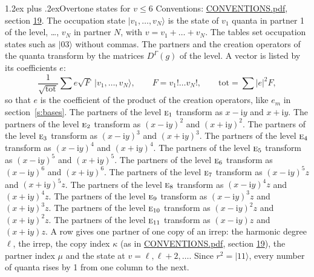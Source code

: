 \documentclass[10pt,a4paper]{article}
\makeatletter
\renewcommand\section{\@startsection{section}{1}{\z@}{-3ex plus -1ex minus -.2ex}%
  {1.2ex plus .2ex}{\normalfont\large\sffamily\bfseries\color{parttitle}}}
\numberwithin{equation}{section}
\newcommand{\irr}[1]{\text{\normalfont\scshape #1}}
\newcommand{\iunit}{\mathrm{i}}
\newcommand{\repD}[1]{D^{#1}}
\newcommand{\mult}{\kappa}
\newcommand{\intx}{\mu}
\newcommand{\occ}[1]{\lvert #1\rangle}
\makeatother
\begin{document}
\section{Overtone states for \texorpdfstring{$v \le 6$}{v \textleq\ 6}}\label{s:overtone_states}
Conventions: \href{../../CONVENTIONS.pdf}{CONVENTIONS.pdf}, section \href{../../CONVENTIONS.pdf\#conv.19}{19}.
\leavevmode\label{n:vector.occupation}\label{n:local.quanta.partner}\label{n:local.weight.occupation}The occupation state $\occ{v_1, \dots, v_N}$ is the state of $v_1$ quanta in partner 1 of the level, \dots, $v_N$ in partner $N$, with $v = v_1 + \dots + v_N$. The tables set occupation states such as $\occ{03}$ without commas. The partners and the creation operators of the quanta transform by the matrices $\repD{\Gamma}(g)$ of the level. A vector is listed by its coefficients $e$:
\begin{equation}\label{e:occupation}\frac{1}{\sqrt{\mathrm{tot}}}\sum e\sqrt{F}\;\occ{v_1, \dots, v_N},\qquad F = v_1!\dots v_N!,\qquad \mathrm{tot} = \sum |e|^2F,\end{equation}
so that $e$ is the coefficient of the product of the creation operators, like $e_m$ in section~\ref{s:bases}. The partners of the level $\irr{e}_{1}$ transform as $x - \iunit y$ and $x + \iunit y$. The partners of the level $\irr{e}_{2}$ transform as $(x - \iunit y)^{2}$ and $(x + \iunit y)^{2}$. The partners of the level $\irr{e}_{3}$ transform as $(x - \iunit y)^{3}$ and $(x + \iunit y)^{3}$. The partners of the level $\irr{e}_{4}$ transform as $(x - \iunit y)^{4}$ and $(x + \iunit y)^{4}$. The partners of the level $\irr{e}_{5}$ transform as $(x - \iunit y)^{5}$ and $(x + \iunit y)^{5}$. The partners of the level $\irr{e}_{6}$ transform as $(x - \iunit y)^{6}$ and $(x + \iunit y)^{6}$. The partners of the level $\irr{e}_{7}$ transform as $(x - \iunit y)^{5} z$ and $(x + \iunit y)^{5} z$. The partners of the level $\irr{e}_{8}$ transform as $(x - \iunit y)^{4} z$ and $(x + \iunit y)^{4} z$. The partners of the level $\irr{e}_{9}$ transform as $(x - \iunit y)^{3} z$ and $(x + \iunit y)^{3} z$. The partners of the level $\irr{e}_{10}$ transform as $(x - \iunit y)^{2} z$ and $(x + \iunit y)^{2} z$. The partners of the level $\irr{e}_{11}$ transform as $(x - \iunit y) z$ and $(x + \iunit y) z$. A row gives one partner of one copy of an irrep: the harmonic degree $\ell$, the irrep, the copy index $\mult$ (as in \href{../../CONVENTIONS.pdf}{CONVENTIONS.pdf}, section \href{../../CONVENTIONS.pdf\#conv.19}{19}), the partner index $\intx$ and the state at $v = \ell, \ell + 2, \dots$. Since $r^2 = \occ{11}$, every number of quanta rises by 1 from one column to the next.
\end{document}
